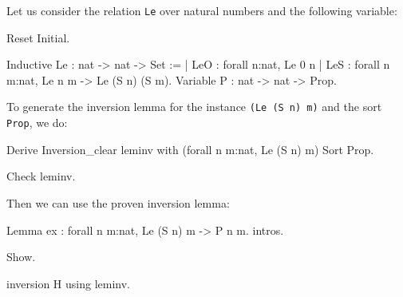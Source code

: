 \Example

Let us consider the relation \texttt{Le} over natural numbers and the
following variable:

\begin{coq_eval}
Reset Initial.
\end{coq_eval}

\begin{coq_example*}
Inductive Le : nat -> nat -> Set :=
  | LeO : forall n:nat, Le 0 n
  | LeS : forall n m:nat, Le n m -> Le (S n) (S m).
Variable P : nat -> nat -> Prop.
\end{coq_example*}

To generate the inversion lemma for the instance
\texttt{(Le (S n) m)} and the sort \texttt{Prop}, we do:

\begin{coq_example*}
Derive Inversion_clear leminv with (forall n m:nat, Le (S n) m) Sort Prop.
\end{coq_example*}

\begin{coq_example}
Check leminv.
\end{coq_example}

Then we can use the proven inversion lemma:

\begin{coq_eval}
Lemma ex : forall n m:nat, Le (S n) m -> P n m.
intros.
\end{coq_eval}

\begin{coq_example}
Show.
\end{coq_example}

\begin{coq_example}
inversion H using leminv.
\end{coq_example}

